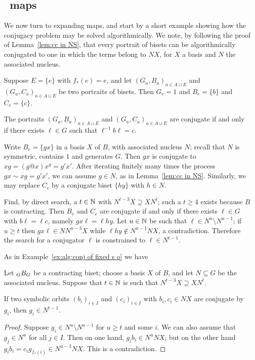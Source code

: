 \documentclass{amsart}
\begin{document}
\subsection{\Exp\ maps}
We now turn to expanding maps, and start by a short example showing
how the conjugacy problem may be solved algorithmically. We note, by
following the proof of Lemma~\ref{lem:cc in NS}, that every portrait
of bisets can be algorithmically conjugated to one in which the terms
belong to $N X$, for $X$ a basis and $N$ the associated nucleus.
\begin{exple}
\label{ex:alg:conj of fixed s o}
  Suppose $E=\{e\}$ with $f_*(e)=e$, and let
  $(G_a,B_a)_{a\in A\sqcup E}$ and $(G_a,C_a)_{a\in A\sqcup E}$ be two
  portraits of bisets. Then $G_e=1$ and $B_e=\{b\}$ and $C_e=\{c\}$.

  The portraits $(G_a,B_a)_{a\in A\sqcup E}$ and $(G_a,C_a)_{a\in
    A\sqcup E}$ are conjugate if and only if there exists $\ell \in G$
  such that $\ell^{-1} b \ell=c$.

  Write $B_e=\{g x\}$ in a basis $X$ of $B$, with associated nucleus
  $N$; recall that $N$ is symmetric, contains $1$ and generates
  $G$. Then $g x$ is conjugate to $x g=(g@x)x^g=g' x'$. After
  iterating finitely many times the process $g x\sim x g=g' x'$, we
  can assume $g\in N$, as in Lemma~\ref{lem:cc in NS}. Similarly, we may replace $C_e$ by a conjugate
  biset $\{h y\}$ with $h\in N$.

  Find, by direct search, a $t\in{\mathbb N}$ with $N^{t-3}X\supseteq X N^t$;
  such a $t\ge 4$ exists because $B$ is contracting. Then $B_e$ and
  $C_e$ are conjugate if and only if there exists $\ell\in G$ with
  $b\ell = \ell c$, namely $g x\ell=\ell h y$. Let $u\in{\mathbb N}$ be such
  that $\ell\in N^u\setminus N^{u-1}$; if $u\ge t$ then
  $g x\ell\in N N^{u-3}X$ while $\ell h y\not\in N^{u-1} N X$, a
  contradiction. Therefore the search for a conjugator $\ell$ is
  constrained to $\ell\in N^{t-1}$.
\end{exple}

As in Example~\ref{ex:alg:conj of fixed s o} we have
\begin{lem}\label{lem:t is min}
  Let $\subscript G B_G$ be a contracting biset; choose a basis $X$ of
  $B$, and let $N\subseteq G$ be the associated nucleus. Suppose that
  $t\in{\mathbb N}$ is such that $N^{t-3}X\supseteq X N^t$.

  If two symbolic orbits $(b_i)_{i\in I}$ and $(c_i)_{i\in I}$ with
  $b_i,c_i\in N X$ are conjugate by $g_i$, then $g_i\in N^{t-1}$.
\end{lem}
\begin{proof}
  Suppose $g_i\in N^u\setminus N^{u-1}$ for $u\ge t$ and some $i$. We
  can also assume that $g_j\in N^u$ for all $j\in I$. Then on one
  hand, $g_i b_i\in N^u N X$; but on the other hand
  $g_i b_i=c_i g_{f_*(i)}\in N^{u-3}N X$. This is a contradiction.
\end{proof}
\end{document}
